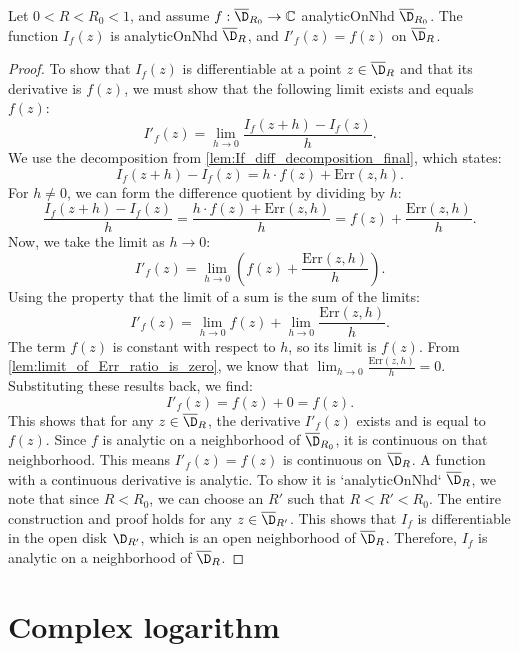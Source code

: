 \begin{lemma}[Differentiability of $I_f(z)$]\label{lem:If_is_differentiable}
\leanok
Let $0<R<R_0<1$, and assume $f:\overline{\D}_{R_0}\to\mathbb{C}$ analyticOnNhd $\overline{\D}_{R_0}$. The function $I_f(z)$ is analyticOnNhd $\overline{\D}_{R}$, and $I'_f(z)=f(z)$ on $\overline{\D}_{R}$.
\end{lemma}
\begin{proof}
\leanok
To show that $I_f(z)$ is differentiable at a point $z \in \overline{\D}_R$ and that its derivative is $f(z)$, we must show that the following limit exists and equals $f(z)$:
\[ I'_f(z) = \lim_{h\to 0} \frac{I_f(z+h)-I_f(z)}{h}. \]
We use the decomposition from \cref{lem:If_diff_decomposition_final}, which states:
\[ I_f(z+h)-I_f(z) = h \cdot f(z) + \mathrm{Err}(z,h). \]
For $h \neq 0$, we can form the difference quotient by dividing by $h$:
\[ \frac{I_f(z+h)-I_f(z)}{h} = \frac{h \cdot f(z) + \mathrm{Err}(z,h)}{h} = f(z) + \frac{\mathrm{Err}(z,h)}{h}. \]
Now, we take the limit as $h \to 0$:
\[ I'_f(z) = \lim_{h\to 0} \left( f(z) + \frac{\mathrm{Err}(z,h)}{h} \right). \]
Using the property that the limit of a sum is the sum of the limits:
\[ I'_f(z) = \lim_{h\to 0} f(z) + \lim_{h\to 0} \frac{\mathrm{Err}(z,h)}{h}. \]
The term $f(z)$ is constant with respect to $h$, so its limit is $f(z)$.
From \cref{lem:limit_of_Err_ratio_is_zero}, we know that $\lim_{h\to 0} \frac{\mathrm{Err}(z,h)}{h} = 0$.
Substituting these results back, we find:
\[ I'_f(z) = f(z) + 0 = f(z). \]
This shows that for any $z \in \overline{\D}_R$, the derivative $I'_f(z)$ exists and is equal to $f(z)$.
Since $f$ is analytic on a neighborhood of $\overline{\D}_{R_0}$, it is continuous on that neighborhood. This means $I'_f(z) = f(z)$ is continuous on $\overline{\D}_R$. A function with a continuous derivative is analytic.
To show it is `analyticOnNhd` $\overline{\D}_{R}$, we note that since $R < R_0$, we can choose an $R'$ such that $R < R' < R_0$. The entire construction and proof holds for any $z \in \overline{\D}_{R'}$. This shows that $I_f$ is differentiable in the open disk $\D_{R'}$, which is an open neighborhood of $\overline{\D}_{R}$. Therefore, $I_f$ is analytic on a neighborhood of $\overline{\D}_{R}$.
\end{proof}

\section{Complex logarithm}

